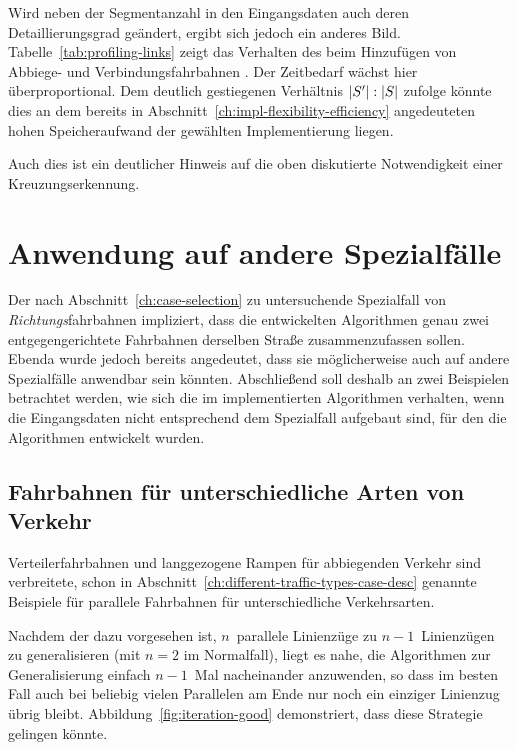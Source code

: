 \documentclass[../main/thesis.tex]{subfiles}
\begin{document}
Wird neben der Segmentanzahl in den Eingangsdaten auch deren Detaillierungsgrad geändert, ergibt sich jedoch ein anderes Bild.
Tabelle~\ref{tab:profiling-links} zeigt das Verhalten des  beim Hinzufügen von Abbiege- und Verbindungsfahrbahnen .
Der Zeitbedarf wächst hier überproportional.
Dem deutlich gestiegenen Verhältnis $|S'|\nobreak:\nobreak|S|$ zufolge könnte dies an dem bereits in Abschnitt~\ref{ch:impl-flexibility-efficiency} angedeuteten hohen Speicheraufwand der gewählten Implementierung liegen.

Auch dies ist ein deutlicher Hinweis auf die oben diskutierte Notwendigkeit einer Kreuzungserkennung.



\section{Anwendung auf andere Spezialfälle}
\label{ch:result-other-cases}

Der nach Abschnitt~\ref{ch:case-selection} zu untersuchende Spezialfall von \emph{Richtungs}fahrbahnen impliziert, dass die entwickelten Algorithmen genau zwei entgegengerichtete Fahrbahnen derselben Straße zusammenzufassen sollen.
Ebenda wurde jedoch bereits angedeutet, dass sie möglicherweise auch auf andere Spezialfälle anwendbar sein könnten.
Abschließend soll deshalb an zwei Beispielen betrachtet werden, wie sich die im  implementierten Algorithmen verhalten, wenn die Eingangsdaten nicht entsprechend dem Spezialfall aufgebaut sind, für den die Algorithmen entwickelt wurden.



\subsection{Fahrbahnen für unterschiedliche Arten von Verkehr}


Verteilerfahrbahnen und langgezogene Rampen für abbiegenden Verkehr sind verbreitete, schon in Abschnitt~\ref{ch:different-traffic-types-case-desc} genannte Beispiele für parallele Fahrbahnen für unterschiedliche Verkehrsarten.

Nachdem der  dazu vorgesehen ist, $n$~parallele Linienzüge zu $n-1$~Linienzügen zu generalisieren (mit $n=2$ im Normalfall), liegt es nahe, die Algorithmen zur Generalisierung einfach $n-1$~Mal nacheinander anzuwenden, so dass im besten Fall auch bei beliebig vielen Parallelen am Ende nur noch ein einziger Linienzug übrig bleibt.
Abbildung~\ref{fig:iteration-good} demonstriert, dass diese Strategie gelingen könnte.
\end{document}
